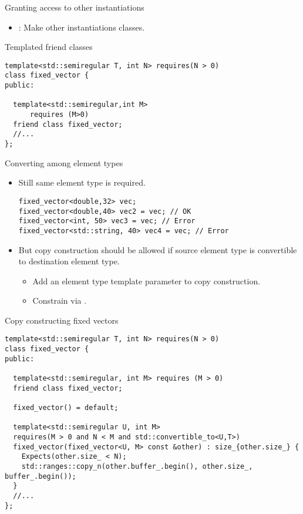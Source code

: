 \begin{frame}[t,fragile]{Granting access to other instantiations}
\begin{itemize}
  \item {}: Make other instantiations  classes.
\end{itemize}

\begin{block}{Templated friend classes}
\begin{lstlisting}
template<std::semiregular T, int N> requires(N > 0)
class fixed_vector {
public:

  template<std::semiregular,int M> 
      requires (M>0)
  friend class fixed_vector;
  //...
};
\end{lstlisting}
\end{block}
\end{frame}

\begin{frame}[t,fragile]{Converting among element types}
\begin{itemize}
  \item Still same element type is required.
\begin{lstlisting}
fixed_vector<double,32> vec;
fixed_vector<double,40> vec2 = vec; // OK
fixed_vector<int, 50> vec3 = vec; // Error
fixed_vector<std::string, 40> vec4 = vec; // Error
\end{lstlisting}

  \item But copy construction should be allowed if source element type is convertible
        to destination element type.
    \begin{itemize}
      \item Add an element type template parameter to copy construction.
      \item Constrain via .
    \end{itemize}
\end{itemize}
\end{frame}

\begin{frame}[t,fragile]
\begin{block}{Copy constructing fixed vectors}
\begin{lstlisting}
template<std::semiregular T, int N> requires(N > 0)
class fixed_vector {
public:

  template<std::semiregular, int M> requires (M > 0)
  friend class fixed_vector;

  fixed_vector() = default;

  template<std::semiregular U, int M>
  requires(M > 0 and N < M and std::convertible_to<U,T>)
  fixed_vector(fixed_vector<U, M> const &other) : size_{other.size_} {
    Expects(other.size_ < N);
    std::ranges::copy_n(other.buffer_.begin(), other.size_, buffer_.begin());
  }
  //...
};
\end{lstlisting}
\end{block}
\end{frame}

